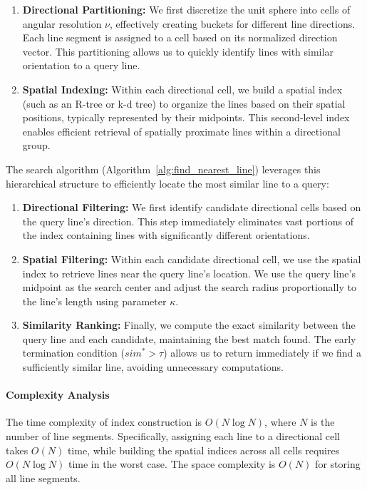 \documentclass[numbers,sort]{article}
\begin{document}
\begin{enumerate}
    \item \textbf{Directional Partitioning:} We first discretize the unit sphere into cells of angular resolution $\nu$, effectively creating buckets for different line directions. Each line segment is assigned to a cell based on its normalized direction vector. This partitioning allows us to quickly identify lines with similar orientation to a query line.
    
    \item \textbf{Spatial Indexing:} Within each directional cell, we build a spatial index (such as an R-tree or k-d tree) to organize the lines based on their spatial positions, typically represented by their midpoints. This second-level index enables efficient retrieval of spatially proximate lines within a directional group.
\end{enumerate}

The search algorithm (Algorithm~\ref{alg:find_nearest_line}) leverages this hierarchical structure to efficiently locate the most similar line to a query:

\begin{enumerate}
    \item \textbf{Directional Filtering:} We first identify candidate directional cells based on the query line's direction. This step immediately eliminates vast portions of the index containing lines with significantly different orientations.
    
    \item \textbf{Spatial Filtering:} Within each candidate directional cell, we use the spatial index to retrieve lines near the query line's location. We use the query line's midpoint as the search center and adjust the search radius proportionally to the line's length using parameter $\kappa$.
    
    \item \textbf{Similarity Ranking:} Finally, we compute the exact similarity between the query line and each candidate, maintaining the best match found. The early termination condition ($sim^* > \tau$) allows us to return immediately if we find a sufficiently similar line, avoiding unnecessary computations.
\end{enumerate}

\paragraph{Complexity Analysis} The time complexity of index construction is $O(N\log N)$, where $N$ is the number of line segments. Specifically, assigning each line to a directional cell takes $O(N)$ time, while building the spatial indices across all cells requires $O(N\log N)$ time in the worst case. The space complexity is $O(N)$ for storing all line segments.
\end{document}

